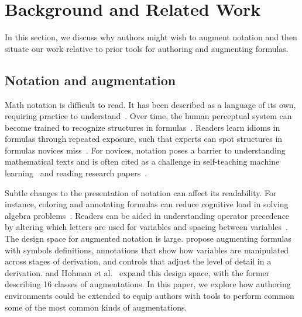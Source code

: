\section{Background and Related Work}

In this section, we discuss why authors might wish to augment notation and then situate our work relative to prior tools for authoring and augmenting formulas.


\subsection{Notation and augmentation}

Math notation is difficult to read. It has been described as a language of its own, requiring practice to understand~\cite{ref:adams2003reading}. Over time, the human perceptual system can become trained to recognize structures in formulas~\cite{ref:marghetis2016mastering}. Readers learn idioms in formulas through repeated exposure, such that experts can spot structures in formulas novices miss~\cite{ref:shepherd2014reading}. For novices, notation poses a barrier to understanding mathematical texts and is often cited as a challenge in self-teaching machine learning~\cite{ref:cai2019software} and reading research papers~\cite{ref:mysore2023how}.

Subtle changes to the presentation of notation can affect its readability. For instance, coloring and annotating formulas can reduce cognitive load in solving algebra problems~\cite{ref:yung2015effects}. Readers can be aided in understanding operator precedence by altering which letters are used for variables and spacing between variables~\cite{ref:goldstone2017adapting,ref:harrison2020spacing}. The design space for augmented notation is large. \citet{ref:dragunov2003designing} propose augmenting formulas with symbols definitions, annotations that show how variables are manipulated across stages of derivation, and controls that adjust the level of detail in a derivation. \citet{ref:head2022math} and Hohman et al.~\cite{ref:hohman2020awesome} expand this design space, with the former describing 16 classes of augmentations.
In this paper, we explore how authoring environments could be extended to equip authors with tools to perform common some of the most common kinds of augmentations.


